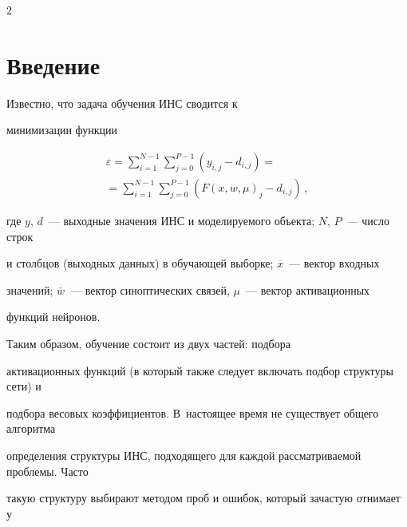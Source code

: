  \begin{multicols}{2}





 \label{st\stat}











\section{Введение}





 Известно, что задача обучения ИНС сводится к


минимизации функции


\begin{multline}


\varepsilon = \sum\limits_{i=1}^{N-1} \sum\limits_{j=0}^{P-1} \left ( y_{i,j}-d_{i,j}\right)={}\\


{}=


\sum\limits_{i=1}^{N-1} \sum\limits_{j=0}^{P-1} \left ( F(x,w,\mu)_j-d_{i,j}\right )\,,


\label{e1kr}


\end{multline}


где $y$, $d$~--- выходные значения ИНС и моделируемого объекта; $N$, $P$~--- число строк


и столбцов (выходных данных) в обучающей выборке; $\overline{x}$~--- вектор входных


значений; $\overline{w}$~--- вектор синоптических связей, $\mu$~--- вектор активационных


функций нейронов.





Таким образом, обучение состоит из двух частей: подбора


активационных функций (в который также следует включать подбор структуры сети) и


подбора весовых коэффициентов. В~настоящее время не существует общего алгоритма


определения структуры ИНС, подходящего для каждой рассматриваемой проблемы. Часто


такую структуру выбирают методом проб и ошибок, который зачастую отнимает у



\end{multicols}

